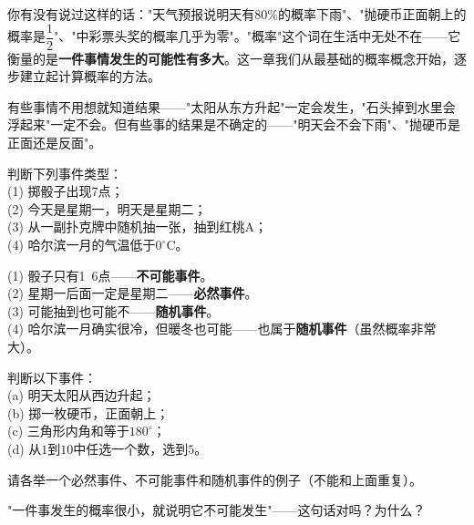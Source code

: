 
你有没有说过这样的话："天气预报说明天有$80\%$的概率下雨"、"抛硬币正面朝上的概率是$\dfrac12$"、"中彩票头奖的概率几乎为零"。"概率"这个词在生活中无处不在——它衡量的是\textbf{一件事情发生的可能性有多大}。这一章我们从最基础的概率概念开始，逐步建立起计算概率的方法。


有些事情不用想就知道结果——"太阳从东方升起"一定会发生，"石头掉到水里会浮起来"一定不会。但有些事的结果是不确定的——"明天会不会下雨"、"抛硬币是正面还是反面"。

\begin{example}
判断下列事件类型：\\
(1) 掷骰子出现$7$点；\\
(2) 今天是星期一，明天是星期二；\\
(3) 从一副扑克牌中随机抽一张，抽到红桃A；\\
(4) 哈尔滨一月的气温低于$0^\circ$C。
\end{example}
\begin{solution}
(1) 骰子只有1~6点——\textbf{不可能事件}。\\
(2) 星期一后面一定是星期二——\textbf{必然事件}。\\
(3) 可能抽到也可能不——\textbf{随机事件}。\\
(4) 哈尔滨一月确实很冷，但暖冬也可能——也属于\textbf{随机事件}（虽然概率非常大）。
\end{solution}


\begin{exercise}
\item 判断以下事件：\\
(a) 明天太阳从西边升起；\\
(b) 掷一枚硬币，正面朝上；\\
(c) 三角形内角和等于$180^\circ$；\\
(d) 从$1$到$10$中任选一个数，选到$5$。
\item 请各举一个必然事件、不可能事件和随机事件的例子（不能和上面重复）。
\item "一件事发生的概率很小，就说明它不可能发生"——这句话对吗？为什么？
\end{exercise}

